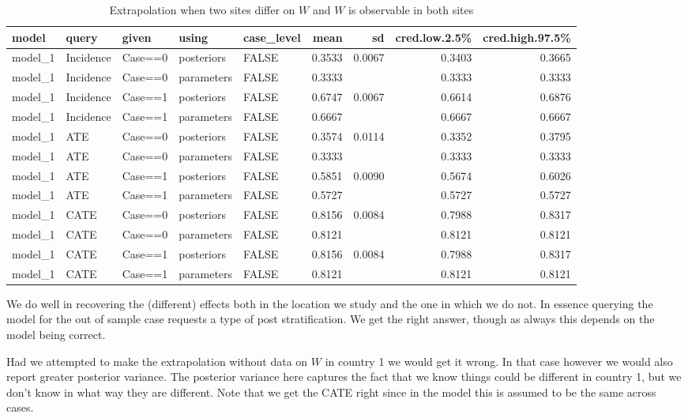 \documentclass[
  12pt,
]{book}
\begin{document}
\begin{table}

\caption{\label{tab:unnamed-chunk-111}Extrapolation when two sites differ on $W$ and $W$ is observable in both sites}
\centering
\begin{tabular}[t]{l|l|l|l|l|r|r|r|r}
\hline
model & query & given & using & case\_level & mean & sd & cred.low.2.5\% & cred.high.97.5\%\\
\hline
model\_1 & Incidence & Case==0 & posteriors & FALSE & 0.3533 & 0.0067 & 0.3403 & 0.3665\\
\hline
model\_1 & Incidence & Case==0 & parameters & FALSE & 0.3333 &  & 0.3333 & 0.3333\\
\hline
model\_1 & Incidence & Case==1 & posteriors & FALSE & 0.6747 & 0.0067 & 0.6614 & 0.6876\\
\hline
model\_1 & Incidence & Case==1 & parameters & FALSE & 0.6667 &  & 0.6667 & 0.6667\\
\hline
model\_1 & ATE & Case==0 & posteriors & FALSE & 0.3574 & 0.0114 & 0.3352 & 0.3795\\
\hline
model\_1 & ATE & Case==0 & parameters & FALSE & 0.3333 &  & 0.3333 & 0.3333\\
\hline
model\_1 & ATE & Case==1 & posteriors & FALSE & 0.5851 & 0.0090 & 0.5674 & 0.6026\\
\hline
model\_1 & ATE & Case==1 & parameters & FALSE & 0.5727 &  & 0.5727 & 0.5727\\
\hline
model\_1 & CATE & Case==0 & posteriors & FALSE & 0.8156 & 0.0084 & 0.7988 & 0.8317\\
\hline
model\_1 & CATE & Case==0 & parameters & FALSE & 0.8121 &  & 0.8121 & 0.8121\\
\hline
model\_1 & CATE & Case==1 & posteriors & FALSE & 0.8156 & 0.0084 & 0.7988 & 0.8317\\
\hline
model\_1 & CATE & Case==1 & parameters & FALSE & 0.8121 &  & 0.8121 & 0.8121\\
\hline
\end{tabular}
\end{table}

We do well in recovering the (different) effects both in the location we study and the one in which we do not. In essence querying the model for the out of sample case requests a type of post stratification. We get the right answer, though as always this depends on the model being correct.

Had we attempted to make the extrapolation without data on \(W\) in country 1 we would get it wrong. In that case however we would also report greater posterior variance. The posterior variance here captures the fact that we know things could be different in country 1, but we don't know in what way they are different. Note that we get the CATE right since in the model this is assumed to be the same across cases.
\end{document}
